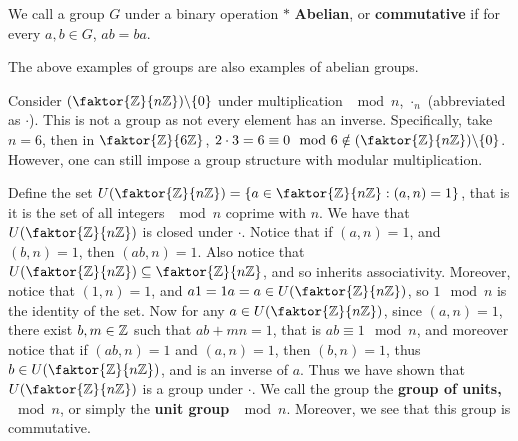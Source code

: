 \begin{definition}
    We call a group $G$ under a binary operation  $\ast$  \textbf{Abelian}, or
    \textbf{commutative} if for every $a,b \in G$,  $ab=ba$.
\end{definition}

\begin{example}
    The above examples of groups are also examples of abelian groups.
\end{example}

\begin{example}
    Consider $\com{(\faktor{\Z}{n\Z})}{\{0\}}$ under multiplication $\mod{n}$,
    $\cdot_n$  (abbreviated as $\cdot$). This is not a group as not every
    element has an inverse. Specifically, take $n=6$, then in
    $\faktor{\Z}{6\Z}$, $2 \cdot 3=6 \equiv 0 \mod{6} \notin
    \com{(\faktor{\Z}{n\Z})}{\{0\}}$. However, one can still impose a group
    structure with modular multiplication.

    Define the set $U(\faktor{\Z}{n\Z})=\{a \in \faktor{\Z}{n\Z} : (a,n)=1\}$,
    that is it is the set of all integers $\mod{n}$ coprime with $n$. We have
    that $U(\faktor{\Z}{n\Z})$ is closed under $\cdot$. Notice that if
    $(a,n)=1$, and $(b,n)=1$, then $(ab,n)=1$. Also notice that
    $U(\faktor{\Z}{n\Z}) \subseteq \faktor{\Z}{n\Z}$, and so inherits
    associativity. Moreover, notice that $(1,n)=1$, and $a1=1a=a \in
    U(\faktor{\Z}{n\Z})$, so $1 \mod{n}$ is the identity of the set. Now for any
    $a \in U(\faktor{\Z}{n\Z})$, since $(a,n)=1$, there exist $b,m \in \mathbb{Z}$ such
    that $ab+mn=1$, that is $ab \equiv 1 \mod{n}$, and moreover notice that if
    $(ab,n)=1$ and $(a,n)=1$, then $(b,n)=1$, thus $b \in U(\faktor{\Z}{n\Z})$,
    and is an inverse of $a$. Thus we have shown that  $U(\faktor{\Z}{n\Z})$ is
    a group under $\cdot$. We call the group the \textbf{group of units,
    $\mod{n}$}, or simply the \textbf{unit group $\mod{n}$}. Moreover, we see
    that this group is commutative.
\end{example}

